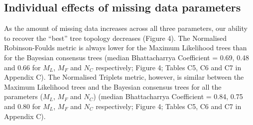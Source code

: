 \documentclass[12pt,letterpaper]{article}
\begin{document}


\subsection{Individual effects of missing data parameters}
As the amount of missing data increases across all three parameters, our ability to recover the ``best'' tree topology decreases (Figure 4).
The Normalised Robinson-Foulds metric is always lower for the Maximum Likelihood trees than for the Bayesian consensus trees (median Bhattacharrya Coefficient = 0.69, 0.48 and 0.66 for $M_{L}$, $M_{F}$ and $N_{C}$ respectively; Figure 4; Tables C5, C6 and C7 in Appendix C). 
The Normalised Triplets metric, however, is similar between the Maximum Likelihood trees and the Bayesian consensus trees for all the parameters ($M_{L}$, $M_{F}$ and $N_{C}$) (median Bhattacharrya Coefficient = 0.84, 0.75 and 0.80 for $M_{L}$, $M_{F}$ and $N_{C}$ respectively; Figure 4; Tables C5, C6 and C7 in Appendix C).
\end{document}
